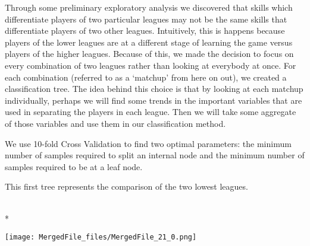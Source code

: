 \documentclass[letterpaper,10pt,english]{/usr/share/sphinx/texinputs/sphinxhowto}
\def\smaller{\fontsize{9.5pt}{9.5pt}\selectfont}
\newenvironment{InvisibleVerbatim}
        {\begin{mdframed}[leftmargin=0.1\linewidth,innerleftmargin=3pt,innerrightmargin=3pt, userdefinedwidth=1\linewidth, linewidth=0pt, linecolor=white, usetwoside=false]}
        {\end{mdframed}}
\begin{document}
Through some preliminary exploratory analysis we discovered that skills
which differentiate players of two particular leagues may not be the
same skills that differentiate players of two other leagues.
Intuitively, this is happens because players of the lower leagues are at
a different stage of learning the game versus players of the higher
leagues. Because of this, we made the decision to focus on every
combination of two leagues rather than looking at everybody at once. For
each combination (referred to as a `matchup' from here on out), we
created a classification tree. The idea behind this choice is that by
looking at each matchup individually, perhaps we will find some trends
in the important variables that are used in separating the players in
each league. Then we will take some aggregate of those variables and use
them in our classification method.

We use 10-fold Cross Validation to find two optimal parameters: the
minimum number of samples required to split an internal node and the
minimum number of samples required to be at a leaf node.

This first tree represents the comparison of the two lowest leagues.

    

        
        

            
                \makebox[0.1\linewidth]{\smaller\hfill\tt\color{nbframe-out-prompt}Out\hspace{4pt}{[}193{]}:\hspace{4pt}}\\*
                \vspace{-2.55\baselineskip}\begin{InvisibleVerbatim}
                \vspace{-0.5\baselineskip}
    \begin{center}
    \texttt{[image: MergedFile\_files/MergedFile\_21\_0.png]}
    \par
    \end{center}
    
            \end{InvisibleVerbatim}
            
        
    
\end{document}
